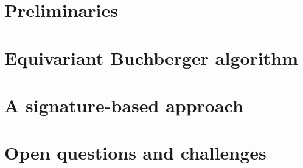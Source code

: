 \documentclass[]{aspm}
\begin{document}
\section{Preliminaries}\label{prelim}



\section{Equivariant Buchberger algorithm}\label{EGB}



\section{A signature-based approach}\label{sec:signature}



\section{Open questions and challenges}\label{sec:challenges}





\end{document}
